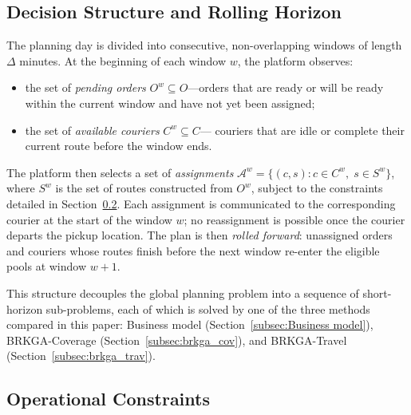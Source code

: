 \documentclass[runningheads]{llncs}
\begin{document}
\vspace{-6pt}
\subsection{Decision Structure and Rolling Horizon}\label{subsec:decisions}

The planning day is divided into consecutive, non-overlapping windows of length $\Delta$ minutes. At the beginning of each window $w$, the platform observes:

\begin{itemize}
    \item the set of \emph{pending orders} $O^w \subseteq O$—orders
    that are ready or will be ready within the current window and
    have not yet been assigned;
    \item the set of \emph{available couriers} $C^w \subseteq C$—
    couriers that are idle or complete their current route before
    the window ends.
\end{itemize}
\vspace{-6pt}
\noindent
The platform then selects a set of \emph{assignments} $\mathcal{A}^w = \{(c, s) : c \in C^w,\; s \in S^w\}$, where $S^w$ is the set of routes constructed from $O^w$,
subject to the constraints detailed in Section~\ref{subsec:constraints}.
Each assignment is communicated to the corresponding courier at the start of the window $w$; no reassignment is possible once the courier departs the pickup location.
The plan is then \emph{rolled forward}: unassigned orders and couriers whose routes finish before the next window re-enter the eligible pools at window $w+1$.

This structure decouples the global planning problem into a sequence of short-horizon sub-problems, each of which is solved by one of the three methods compared in this paper: Business model (Section~\ref{subsec:Business model}), BRKGA-Coverage (Section~\ref{subsec:brkga_cov}), and BRKGA-Travel (Section~\ref{subsec:brkga_trav}).


\subsection{Operational Constraints}\label{subsec:constraints}
\end{document}
